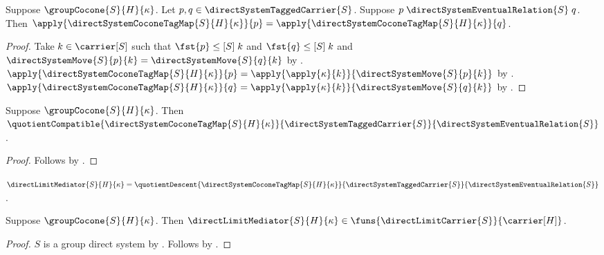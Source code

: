 \begin{lemma}\label{direct_system_cocone_tag_map_respects_equivalence}
    Suppose $\groupCocone{S}{H}{\kappa}$.
    Let $p,q\in\directSystemTaggedCarrier{S}$.
    Suppose $p\mathrel{\directSystemEventualRelation{S}}q$.
    Then
        $\apply{\directSystemCoconeTagMap{S}{H}{\kappa}}{p}
        =\apply{\directSystemCoconeTagMap{S}{H}{\kappa}}{q}$.
\end{lemma}
\begin{proof}
    Take $k\in\carrier[S]$ such that
        $\fst{p}\mathrel{\leq[S]}k$ and
        $\fst{q}\mathrel{\leq[S]}k$ and
        $\directSystemMove{S}{p}{k}
            =\directSystemMove{S}{q}{k}$ by
        .
    $\apply{\directSystemCoconeTagMap{S}{H}{\kappa}}{p}
        =\apply{\apply{\kappa}{k}}{\directSystemMove{S}{p}{k}}$ by
        .
    $\apply{\directSystemCoconeTagMap{S}{H}{\kappa}}{q}
        =\apply{\apply{\kappa}{k}}{\directSystemMove{S}{q}{k}}$ by
        .
\end{proof}

\begin{theorem}\label{direct_system_cocone_tag_map_compatible}
    Suppose $\groupCocone{S}{H}{\kappa}$.
    Then $\quotientCompatible
        {\directSystemCoconeTagMap{S}{H}{\kappa}}
        {\directSystemTaggedCarrier{S}}
        {\directSystemEventualRelation{S}}$.
\end{theorem}
\begin{proof}
    Follows by
        .
\end{proof}

\begin{definition}\label{group_direct_limit_mediator}
    $\directLimitMediator{S}{H}{\kappa}=
        \quotientDescent
            {\directSystemCoconeTagMap{S}{H}{\kappa}}
            {\directSystemTaggedCarrier{S}}
            {\directSystemEventualRelation{S}}$.
\end{definition}

\begin{theorem}\label{direct_limit_mediator_type}
    Suppose $\groupCocone{S}{H}{\kappa}$.
    Then $\directLimitMediator{S}{H}{\kappa}\in
        \funs{\directLimitCarrier{S}}{\carrier[H]}$.
\end{theorem}
\begin{proof}
    $S$ is a group direct system by
        .
    Follows by
        .
\end{proof}

